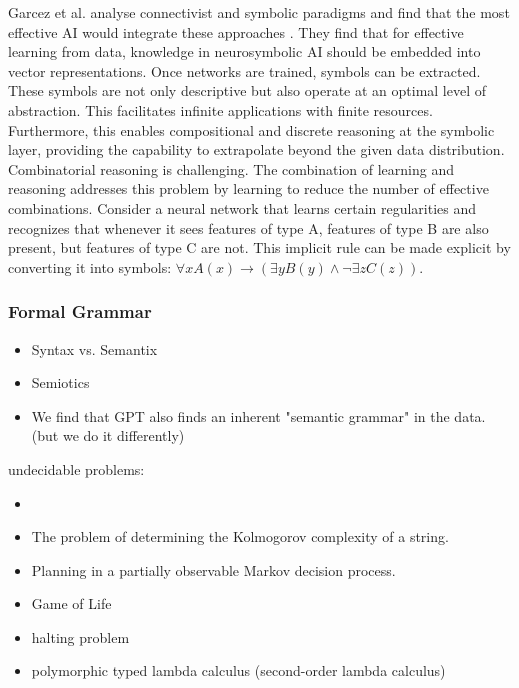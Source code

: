 Garcez et al. analyse connectivist and symbolic paradigms and find that the most effective AI would integrate these approaches \cite{garcez2020neurosymbolic}. They find that for effective learning from data, knowledge in neurosymbolic AI should be embedded into vector representations. Once networks are trained, symbols can be extracted. These symbols are not only descriptive but also operate at an optimal level of abstraction. This facilitates infinite applications with finite resources. Furthermore, this enables compositional and discrete reasoning at the symbolic layer, providing the capability to extrapolate beyond the given data distribution. Combinatorial reasoning is challenging. The combination of learning and reasoning addresses this problem by learning to reduce the number of effective combinations. 
Consider a neural network that learns certain regularities and recognizes that whenever it sees features of type A, features of type B are also present, but features of type C are not. This implicit rule can be made explicit by converting it into symbols: $\forall x A(x) \rightarrow (\exists y B(y) \land \lnot \exists z C(z))$.


\subsubsection{Formal Grammar}
\begin{itemize}
    \item Syntax vs. Semantix
    \item Semiotics
    \item We find that GPT also finds an inherent "semantic grammar" in the data. (but we do it differently)
\end{itemize}

undecidable problems:
\begin{itemize}
    \item {}
    \item The problem of determining the Kolmogorov complexity of a string.
    \item Planning in a partially observable Markov decision process.
    \item Game of Life
    \item halting problem
    \item polymorphic typed lambda calculus (second-order lambda calculus)
\end{itemize}

